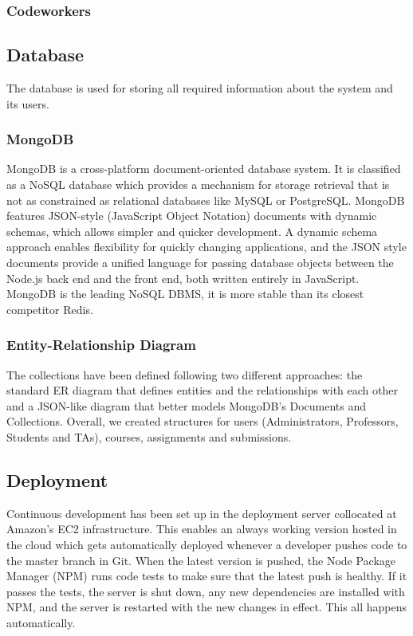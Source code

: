 \subsubsection{Codeworkers}

\subsection{Database}

The database is used for storing all required information about the system and
its users.

\subsubsection{MongoDB}

MongoDB is a cross-platform document-oriented database system. It is classified
as a NoSQL database which provides a mechanism for storage retrieval that is not
as constrained as relational databases like MySQL or PostgreSQL. MongoDB
features JSON-style (JavaScript Object Notation) documents with dynamic schemas,
which allows simpler and quicker development. A dynamic schema approach enables
flexibility for quickly changing applications, and the JSON style documents
provide a unified language for passing database objects between the Node.js
back end and the front end, both written entirely in JavaScript. MongoDB is the
leading NoSQL DBMS, it is more stable than its closest competitor Redis.

\subsubsection{Entity-Relationship Diagram}

The collections have been defined following two different approaches: the
standard ER diagram that defines entities and the relationships with each other
and a JSON-like diagram that better models MongoDB's Documents and Collections.
Overall, we created structures for users (Administrators, Professors, Students
and TAs), courses, assignments and submissions.




\subsection{Deployment}

Continuous development has been set up in the deployment server collocated at
Amazon's EC2 infrastructure. This enables an always working version hosted in
the cloud which gets automatically deployed whenever a developer pushes code to
the master branch in Git. When the latest version is pushed, the Node Package
Manager (NPM) runs code tests to make sure that the latest push is healthy. If
it passes the tests, the server is shut down, any new dependencies are installed
with NPM, and the server is restarted with the new changes in effect. This all
happens automatically.


